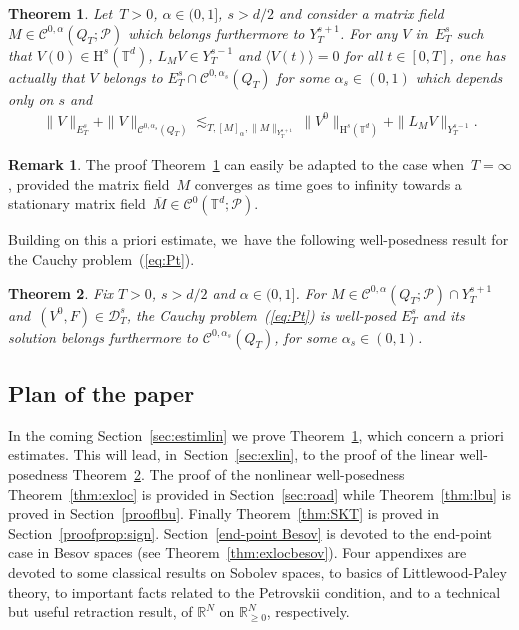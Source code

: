 \documentclass[10pt]{amsart}
\newtheorem{thm}{Theorem}
\theoremstyle{definition}
\newtheorem{rem}[prop]{Remark}
\newcommand\R{\mathbb{R}}
\newcommand\T{\mathbb{T}}
\renewcommand\H{\mathrm{H}}
\begin{document}
\begin{thm} \label{thm:PetrovskiiHs}
Let~$T>0$, $\alpha\in(0,1]$, $s>d/2$ and consider a matrix field $M\in\mathscr{C}^{0,\alpha}(Q_T;\mathscr{P})$ which belongs furthermore to $Y_T^{s+1}$. For any $V$ in~$E_T^s$ such that $V(0)\in\H^s(\T^d)$, $L_{M }V\in Y_T^{s-1}$ and $\langle V(t)\rangle=0$ for all $t\in[0,T]$, {one has actually} that $V$ belongs to $E_T^s\cap\mathscr{C}^{0,\alpha_s}(Q_T)$ for some $\alpha_s\in(0,1)$ which depends only on $s$ and
\begin{align}\label{thm2Hsestimate}
\| V \|_{E_T^s} + \|V\|_{\mathscr{C}^{0,\alpha_s}(Q_T)} \lesssim_{T,[M]_{\alpha},\|M\|_{Y_T^{s+1}}} \|V^0\|_{\H^s(\T^d)} + \|L_{M }V\|_{Y_T^{s-1}}.
\end{align}
\end{thm}

\begin{rem}\label{rem:no T dependence} The proof Theorem~\ref{thm:PetrovskiiHs} can easily be adapted to the case when~$T = \infty$, provided the matrix field~$M$ converges as time goes to infinity towards a stationary matrix field~$\overline M \in {\mathscr{C}^0}(\T^d;\mathscr{P})$.
\end{rem}

Building on this a priori estimate, we~have the following well-posedness result for the Cauchy problem~(\ref{eq:Pt}).
\begin{thm}\label{thm:exlin}
Fix $T>0$, $s>d/2$ and $\alpha\in(0,1]$. For $M\in\mathscr{C}^{0,\alpha}(Q_T;\mathscr{P})\cap Y_T^{s+1}$ and~$(V^0,F) \in \mathcal D_T^s$, the Cauchy problem~{\rm(\ref{eq:Pt})} is well-posed $E_T^s$ and its solution belongs furthermore to $\mathscr{C}^{0,\alpha_s}(Q_T)$, for some $\alpha_s\in(0,1)$.
\end{thm}
\subsection{Plan of the paper}
In the coming Section~\ref{sec:estimlin} we prove Theorem~\ref{thm:PetrovskiiHs}, which concern a priori estimates. This will lead, in~Section~\ref{sec:exlin}, to the proof of the linear well-posedness Theorem~\ref{thm:exlin}. The proof of the nonlinear well-posedness Theorem~\ref{thm:exloc}
is provided in Section~\ref{sec:road} while Theorem~\ref{thm:lbu} is proved in Section~\ref{prooflbu}. Finally Theorem~\ref{thm:SKT} is proved in Section~\ref{proofprop:sign}.
Section~\ref{end-point Besov} is devoted to the end-point case in Besov spaces (see Theorem~\ref{thm:exlocbesov}).
Four appendixes are devoted to some classical results on Sobolev spaces, to basics of Littlewood-Paley theory, to important facts related to the Petrovskii condition, and to a technical but useful retraction result, of $\R^N$ on $\R_{\geq 0}^N$, respectively.
\end{document}
